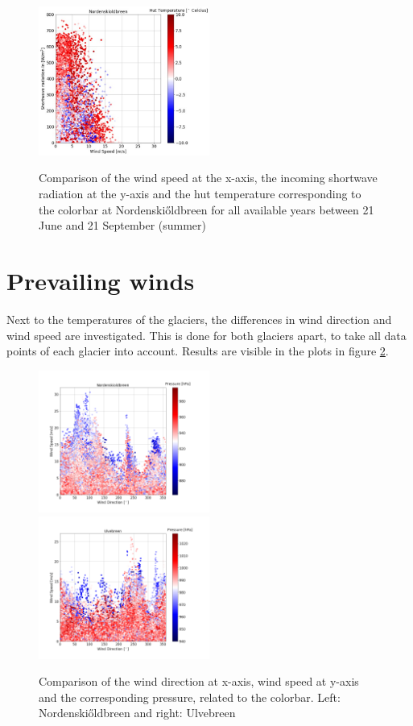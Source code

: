 \documentclass[11pt]{report}
\begin{document}
\begin{figure}[h]
\centering{}
    \includegraphics[scale=0.5, width=0.5\textwidth]{Thut-Sin.jpg}
    \label{fig:Thut}
    \caption{Comparison of the wind speed at the x-axis, the incoming shortwave radiation at the y-axis and the hut temperature corresponding to the colorbar at Nordenski\H{o}ldbreen for all available years between 21 June and 21 September (summer) }
\end{figure}


\newpage
\section{Prevailing winds}\label{sec:katw}
Next to the temperatures of the glaciers, the differences in wind direction and wind speed are investigated. This is done for both glaciers apart, to take all data points of each glacier into account. Results are visible in the plots in figure \ref{fig:PR}. 

\begin{figure}[h]
\includegraphics[scale=1, width=0.5\textwidth]{WD-WS-PR-Nordenskioldbreen.png}
\includegraphics[scale=1, width=0.5\textwidth]{WD-WS-PR-Ulvebreen.png}
\caption{Comparison of the wind direction at x-axis, wind speed at y-axis and the corresponding pressure, related to the colorbar. Left: Nordenski\H{o}ldbreen and right: Ulvebreen}
\label{fig:PR}
\end{figure}
\end{document}
